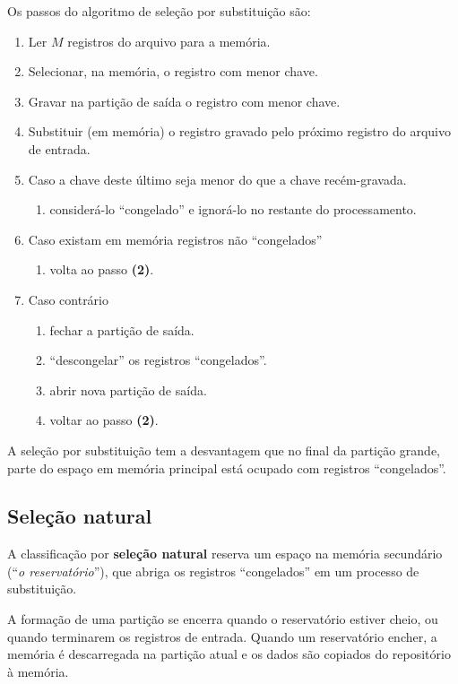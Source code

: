 Os passos do algoritmo de seleção por substituição são:
\begin{enumerate}
\item Ler $M$ registros do arquivo para a memória.
\item Selecionar, na memória, o registro com menor chave.
\item Gravar na partição de saída o registro com menor chave.
\item Substituir (em memória) o registro gravado pelo próximo registro
do arquivo de entrada.
\item Caso a chave deste último seja menor do que a chave recém-gravada.
	\begin{enumerate}
	\item considerá-lo ``congelado'' e ignorá-lo no restante do processamento.
	\end{enumerate}
\item Caso existam em memória registros não ``congelados''
	\begin{enumerate}
	\item volta ao passo {\bf (2)}.
	\end{enumerate}
\item Caso contrário
	\begin{enumerate}
	\item fechar a partição de saída.
	\item ``descongelar'' os registros ``congelados''.
	\item abrir nova partição de saída.
	\item voltar ao passo {\bf (2)}.
	\end{enumerate}
\end{enumerate}

A seleção por substituição tem a desvantagem que no final da partição grande, 
parte do espaço em memória principal está ocupado com registros ``congelados''.

\subsection{Seleção natural}

A classificação por {\bf seleção natural} reserva um espaço na memória 
secundário (``\emph{o reservatório}''), que abriga os registros
``congelados'' em um processo de substituição.

A formação de uma partição se encerra quando o reservatório estiver cheio, ou
quando terminarem os registros de entrada.
Quando um reservatório encher, a memória é descarregada na partição atual
e os dados são copiados do repositório à memória.

